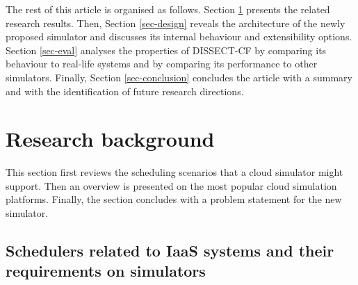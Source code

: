 \documentclass[sort, compress, 5p]{elsarticle}
\begin{document}
The rest of this article is organised as follows. Section \ref{sec-relworks} presents the related research results. Then, Section \ref{sec-design} reveals the architecture of the newly proposed simulator and discusses its internal behaviour and extensibility options. Section \ref{sec-eval} analyses the properties of DISSECT-CF by comparing its behaviour to real-life systems and by comparing its performance to other simulators. Finally, Section \ref{sec-conclusion} concludes the article with a summary and with the identification of future research directions.

\section{Research background} \label{sec-relworks}
This section first reviews the scheduling scenarios that a cloud simulator might support. Then an overview is presented on the most popular cloud simulation platforms. Finally, the section concludes with a problem statement for the new simulator.

\subsection{Schedulers related to IaaS systems and their requirements on simulators} \label{sec-schedulers}
\end{document}
